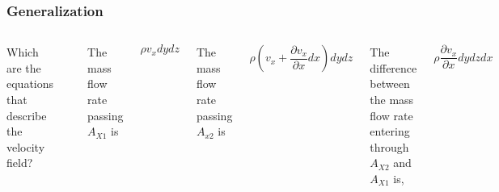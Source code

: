 \documentclass[]{beamer}
\begin{document}
\begin{frame}

\frametitle{Generalization}


   \begin{columns}[c]
   \column{1.7in}  %

Which are the equations that describe the velocity field?
\pause

    \begin{center}
  \includegraphics[height=0.8in]{images2/generalization2.jpg}
\end{center}

   \column{2.3in}

\pause

The mass flow rate  passing $A_{X1}$ is

\begin{equation*}
\rho v_xdydz
\end{equation*}

\pause
The mass flow rate  passing $A_{x2}$ is


\begin{equation*}
\rho  (v_x+\frac{\partial v_x}{\partial x} dx)dydz
\end{equation*}

\pause
The difference between the mass flow rate entering through $A_{X2}$ and $A_{X1}$ is,

\begin{equation*}
\rho \frac{\partial v_x}{\partial x} dydzdx
\end{equation*}

\end{columns}







 \end{frame}




\end{document}
